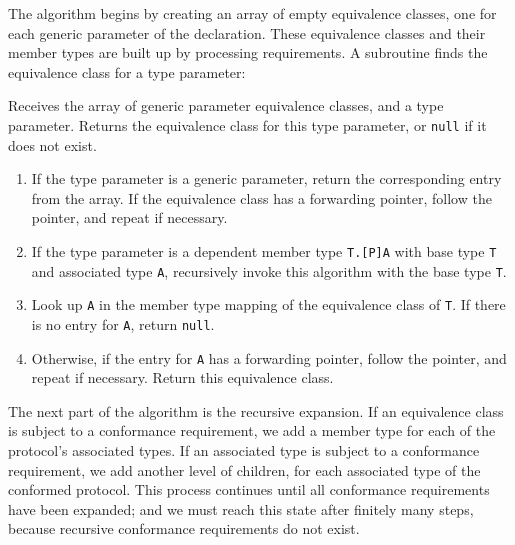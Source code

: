 \documentclass[../generics]{subfiles}
\begin{document}
The algorithm begins by creating an array of empty equivalence classes, one for each generic parameter of the declaration. These equivalence classes and their member types are built up by processing requirements. A subroutine finds the equivalence class for a type parameter:
\begin{algorithm}\label{archetype builder lookup} Receives the array of generic parameter equivalence classes, and a type parameter. Returns the equivalence class for this type parameter, or \texttt{null} if it does not exist.
\begin{enumerate}
\item If the type parameter is a generic parameter, return the corresponding entry from the array. If the equivalence class has a forwarding pointer, follow the pointer, and repeat if necessary.
\item If the type parameter is a dependent member type \texttt{T.[P]A} with base type \texttt{T} and associated type \texttt{A}, recursively invoke this algorithm with the base type \texttt{T}.
\item Look up \texttt{A} in the member type mapping of the equivalence class of \texttt{T}. If there is no entry for \texttt{A}, return \texttt{null}.
\item Otherwise, if the entry for \texttt{A} has a forwarding pointer, follow the pointer, and repeat if necessary. Return this equivalence class.
\end{enumerate}
\end{algorithm}
The next part of the algorithm is the recursive expansion. If an equivalence class is subject to a conformance requirement, we add a member type for each of the protocol's associated types. If an associated type is subject to a conformance requirement, we add another level of children, for each associated type of the conformed protocol. This process continues until all conformance requirements have been expanded; and we must reach this state after finitely many steps, because recursive conformance requirements do not exist.
\end{document}
